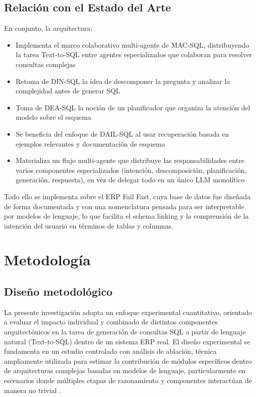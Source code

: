 \documentclass[journal]{IEEEtran}
\begin{document}
\subsection{Relación con el Estado del Arte}

En conjunto, la arquitectura:
\begin{itemize}
	\item Implementa el marco colaborativo multi-agente de MAC-SQL, distribuyendo la tarea Text-to-SQL entre agentes especializados que colaboran para resolver consultas complejas
	\item Retoma de DIN-SQL la idea de descomponer la pregunta y analizar la complejidad antes de generar SQL
	\item Toma de DEA-SQL la noción de un planificador que organiza la atención del modelo sobre el esquema
	\item Se beneficia del enfoque de DAIL-SQL al usar recuperación basada en ejemplos relevantes y documentación de esquema
	\item Materializa un flujo multi-agente que distribuye las responsabilidades entre varios componentes especializados (intención, descomposición, planificación, generación, respuesta), en vez de delegar todo en un único LLM monolítico
\end{itemize}

Todo ello se implementa sobre el ERP Fail Fast, cuya base de datos fue diseñada de forma documentada y con una nomenclatura pensada para ser interpretable por modelos de lenguaje, lo que facilita el schema linking y la comprensión de la intención del usuario en términos de tablas y columnas.




\section{Metodología}

\subsection{Diseño metodológico}

La presente investigación adopta un enfoque experimental cuantitativo, orientado a evaluar el impacto individual y combinado de distintos componentes arquitectónicos en la tarea de generación de consultas SQL a partir de lenguaje natural (Text-to-SQL) dentro de un sistema ERP real. El diseño experimental se fundamenta en un estudio controlado con análisis de ablación, técnica ampliamente utilizada para estimar la contribución de módulos específicos dentro de arquitecturas complejas basadas en modelos de lenguaje, particularmente en escenarios donde múltiples etapas de razonamiento y componentes interactúan de manera no trivial \cite{wang2025mac}.
\end{document}
